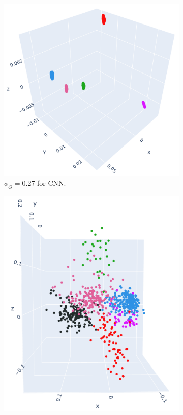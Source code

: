 \begin{figure}[H]
\centering
\begin{subfigure}[b]{0.3\textwidth}
        \includegraphics[width=\textwidth]{figures/embeddings/VGG16-2D-block1.png}
        \caption{$\phi_G = 0.27$ for CNN.}
\end{subfigure}
\hfill
\begin{subfigure}[b]{0.3\textwidth}
        \includegraphics[width=\textwidth]{figures/biological/retina-manifold.png}

\end{subfigure}
\end{figure}
